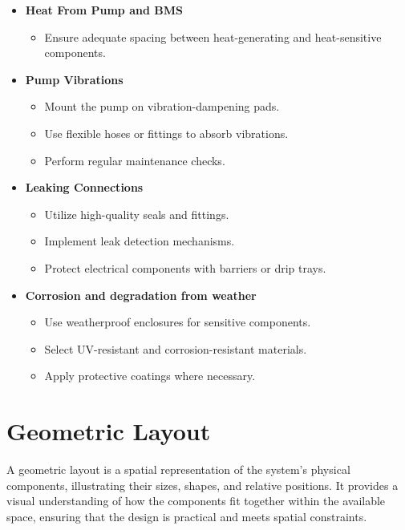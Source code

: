 \documentclass[12pt]{article}
\begin{document}
\begin{itemize}
    \item \textbf{Heat From Pump and BMS}
    \begin{itemize}
        \item Ensure adequate spacing between heat-generating and heat-sensitive components.
    \end{itemize}
    \item \textbf{Pump Vibrations}
    \begin{itemize}
        \item Mount the pump on vibration-dampening pads.
        \item Use flexible hoses or fittings to absorb vibrations.
        \item Perform regular maintenance checks.
    \end{itemize}
    \item \textbf{Leaking Connections}
    \begin{itemize}
        \item Utilize high-quality seals and fittings.
        \item Implement leak detection mechanisms.
        \item Protect electrical components with barriers or drip trays.
    \end{itemize}
    \item \textbf{Corrosion and degradation from weather}
    \begin{itemize}
        \item Use weatherproof enclosures for sensitive components.
        \item Select UV-resistant and corrosion-resistant materials.
        \item Apply protective coatings where necessary.
    \end{itemize}

\end{itemize}




\newpage
\section{Geometric Layout}
\label{sec:geometric_layout}

A geometric layout is a spatial representation of the system's physical components, illustrating their sizes, shapes, and relative positions. It provides a visual understanding of how the components fit together within the available space, ensuring that the design is practical and meets spatial constraints.
\end{document}

